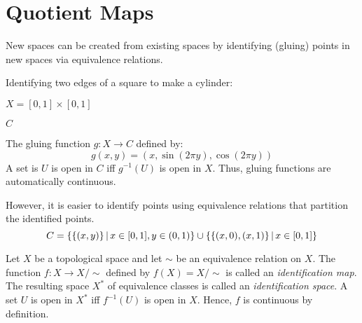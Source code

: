 \documentclass[letterpaper,12pt,fleqn]{article}
\begin{document}
\section*{Quotient Maps}

New spaces can be created from existing spaces by identifying (gluing) points in new spaces via equivalence
relations.

\begin{example}[Cylinder]

  Identifying two edges of a square to make a cylinder:

  \bigskip

  \begin{minipage}{3in}
    \centering

    \bigskip

    \(X=[0,1]\times[0,1]\)
  \end{minipage}
  \begin{minipage}{3in}
    \centering

    \bigskip

    \(C\)
  \end{minipage}

  The gluing function \(g:X\to C\) defined by:
  \[g(x,y)=(x,\sin(2\pi y),\cos(2\pi y))\]
  A set is \(U\) is open in \(C\) iff \(g^{-1}(U)\) is open in \(X\).  Thus, gluing functions are automatically
  continuous.

  However, it is easier to identify points using equivalence relations that partition the identified points.
  \[C=\left\{{\{(x,y)\}}\,\middle|\,{x\in[0,1],y\in(0,1)}\right\}\cup\left\{{\{(x,0),(x,1)\}}\,\middle|\,{x\in[0,1]}\right\}\]
\end{example}

\begin{definition}
  Let \(X\) be a topological space and let \(\sim\) be an equivalence relation on \(X\).  The function
  \(f:X\to X/\sim\) defined by \(f(X)=X/\sim\) is called an \emph{identification map}.  The resulting space \(X^*\)
  of equivalence classes is called an \emph{identification space}.  A set \(U\) is open in \(X^*\) iff \(f^{-1}(U)\)
  is open in \(X\).  Hence, \(f\) is continuous by definition.
\end{definition}
\end{document}

